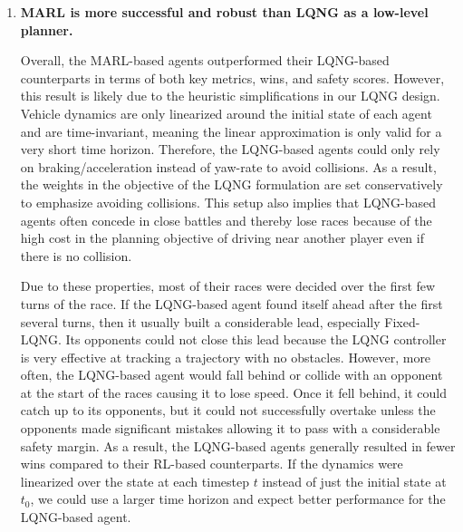 \begin{enumerate}[wide, labelindent=0pt, font=\bfseries]
\item \textbf{MARL is more successful and robust than LQNG as a low-level planner.}  

Overall, the MARL-based agents outperformed their LQNG-based counterparts in terms of both key metrics, wins, and safety scores. However, this result is likely due to the heuristic simplifications in our LQNG design. Vehicle dynamics are only linearized around the initial state of each agent and are time-invariant, meaning the linear approximation is only valid for a very short time horizon. Therefore, the LQNG-based agents could only rely on braking/acceleration instead of yaw-rate to avoid collisions. As a result, the weights in the objective of the LQNG formulation are set conservatively to emphasize avoiding collisions. This setup also implies that LQNG-based agents often concede in close battles and thereby lose races because of the high cost in the planning objective of driving near another player even if there is no collision. 

Due to these properties, most of their races were decided over the first few turns of the race. If the LQNG-based agent found itself ahead after the first several turns, then it usually built a considerable lead, especially Fixed-LQNG. Its opponents could not close this lead because the LQNG controller is very effective at tracking a trajectory with no obstacles. However, more often, the LQNG-based agent would fall behind or collide with an opponent at the start of the races causing it to lose speed. Once it fell behind, it could catch up to its opponents, but it could not successfully overtake unless the opponents made significant mistakes allowing it to pass with a considerable safety margin. As a result, the LQNG-based agents generally resulted in fewer wins compared to their RL-based counterparts. If the dynamics were linearized over the state at each timestep $t$ instead of just the initial state at $t_0$, we could use a larger time horizon and expect better performance for the LQNG-based agent. 


\end{enumerate}
